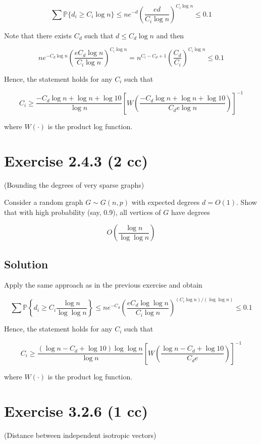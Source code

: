 \documentclass{article}
\begin{document}
$$ \sum \mathbb P \{ d_i \geq C_i \log n \} \leq n e^{-d} \left(\frac{e d}{C_i \log n}\right)^{C_i \log n} \leq 0.1$$

Note that there exists $C_d$ such that $d \leq C_d \log n$ and then

$$n e^{-C_d \log n} \left(\frac{e C_d \log n}{C_i \log n}\right)^{C_i \log n} = n^{C_i - C_d + 1} \left(\frac{C_d}{C_i}\right)^{C_i \log n} \leq 0.1$$

Hence, the statement holds for any $C_i$ such that

$$C_i \geq \frac{-C_d \log n + \log n + \log 10}{\log n } \left[W \left(\frac{-C_d \log n + \log n + \log 10}{C_d e \log n}\right)\right]^{-1}$$

where $W(\cdot)$ is the product log function.

\section{Exercise 2.4.3 (2 cc)}

(Bounding the degrees of very sparse graphs)

Consider a random graph $G \sim G(n, p)$ with expected degrees $d = O(1)$. Show that with high probability (say, 0.9), all vertices of $G$ have degrees

$$O\left(\frac{\log n}{\log \log n}\right)$$

\subsection{Solution}

Apply the same approach as in the previous exercise and obtain

$$ \sum \mathbb P \left\{ d_i \geq C_i \frac{\log n}{\log \log n} \right\} \leq n e^{-C_d} \left(\frac{e C_d \log \log n}{C_i \log n}\right)^{(C_i \log n) / (\log \log n)} \leq 0.1$$

Hence, the statement holds for any $C_i$ such that

$$C_i \geq \frac{(\log n - C_d + \log 10)\log \log n}{\log n} \left[W\left( \frac{\log n - C_d + \log 10}{C_d e} \right)\right]^{-1}$$

where $W(\cdot)$ is the product log function.

\section{Exercise 3.2.6 (1 cc)}
(Distance between independent isotropic vectors)
\end{document}
